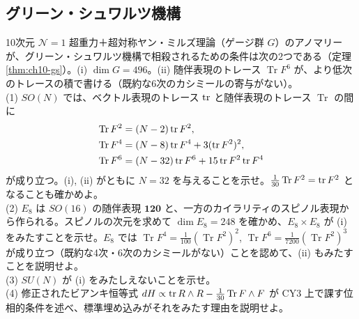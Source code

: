 \subsection{グリーン・シュワルツ機構}

\begin{problem}[難易度 C]\label{ch10-prob-gs}
10次元 $\mathcal N=1$ 超重力＋超対称ヤン・ミルズ理論（ゲージ群 $G$）のアノマリーが、グリーン・シュワルツ機構で相殺されるための条件は次の2つである（定理 \ref{thm:ch10-gs}）。(i) $\dim G=496$。(ii) 随伴表現のトレース $\operatorname{Tr}F^6$ が、より低次のトレースの積で書ける（既約な6次のカシミールの寄与がない）。\\
(1) $SO(N)$ では、ベクトル表現のトレース $\tr$ と随伴表現のトレース $\operatorname{Tr}$ の間に
\begin{align*}
\operatorname{Tr}F^2&=(N-2)\tr F^2,\\
\operatorname{Tr}F^4&=(N-8)\tr F^4+3(\tr F^2)^2,\\
\operatorname{Tr}F^6&=(N-32)\tr F^6+15\tr F^2\tr F^4
\end{align*}
が成り立つ。(i), (ii) がともに $N=32$ を与えることを示せ。$\frac1{30}\operatorname{Tr}F^2=\tr F^2$ となることも確かめよ。\\
(2) $E_8$ は $SO(16)$ の随伴表現 $\mathbf{120}$ と、一方のカイラリティのスピノル表現から作られる。スピノルの次元を求めて $\dim E_8=248$ を確かめ、$E_8\times E_8$ が (i) をみたすことを示せ。$E_8$ では $\operatorname{Tr}F^4=\frac1{100}(\operatorname{Tr}F^2)^2$, $\operatorname{Tr}F^6=\frac1{7200}(\operatorname{Tr}F^2)^3$ が成り立つ（既約な4次・6次のカシミールがない）ことを認めて、(ii) もみたすことを説明せよ。\\
(3) $SU(N)$ が (i) をみたしえないことを示せ。\\
(4) 修正されたビアンキ恒等式 $dH\propto\tr R\wedge R-\frac1{30}\operatorname{Tr}F\wedge F$ が CY3 上で課す位相的条件を述べ、標準埋め込みがそれをみたす理由を説明せよ。
\end{problem}

